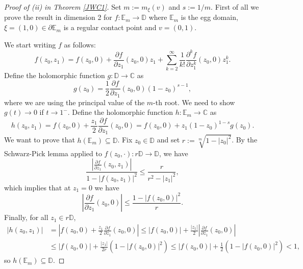 \documentclass[11pt, reqno]{amsart}
\numberwithin{equation}{section}
\theoremstyle{definition}
\newcommand{\C}{\mathbb{C}}
\newcommand{\D}{\mathbb{D}}
\begin{document}
{{{		
		
		\begin{proof}[Proof of (ii) in  Theorem \ref{JWC1}]  
			Set $m:=m_\xi(v)$ and $s:=1/m$. First of all we prove the result in dimension 2 for $f\colon \mathbb{E}_m\to\D$ where $\mathbb{E}_m$ is the egg domain, $\xi=(1,0)\in\partial\mathbb{E}_m$ is a regular contact point and $v=(0,1)$. 
			
			We start writing  $f$ as follows:
			$$f(z_0,z_1)=f(z_0,0)+\frac{\partial f}{\partial z_1}(z_0,0)z_1+\sum_{k=2}^{\infty}\frac{1}{k!}\frac{\partial^kf}{\partial z_1^k}(z_0,0)z_1^k.$$
			Define the holomorphic function $g\colon \D\to \C$  as
			$$g(z_0)=\frac{1}{2}\frac{\partial f}{\partial z_1}(z_0,0)(1-z_0)^{s-1},$$ where we are using  the principal value of the $m$-th root. 
			We need to show $g(t)\to0$ if $t\to1^-$.
			Define the holomorphic function $h\colon \mathbb{E}_m\to \C$  as $$h(z_0,z_1)=f(z_0,0)+\frac{z_1}{2}\frac{\partial f}{\partial z_1}(z_0,0)=f(z_0,0)+z_1(1-z_0)^{1-s}g(z_0).$$
			We want to prove that $h(\mathbb{E}_m)\subseteq\D$. Fix $z_0\in\D$ and set $r:=\sqrt[m]{1-|z_0|^2}$. By the Schwarz-Pick lemma applied to $f(z_0,\cdot)\colon r\D\to \D$, we have
			$$\frac{\left|\frac{\partial f}{\partial z_1}(z_0,z_1)\right|}{1-|f(z_0,z_1)|^2}\leq\frac{r}{r^2-|z_1|^2},$$
			which implies that at $z_1=0$ we have $$\left|\frac{\partial f}{\partial z_1}(z_0,0)\right|\leq\frac{1-|f(z_0,0)|^2}{r}.$$
			Finally, for all $z_1\in r\D$,
			\begin{align*}|h(z_0,z_1)|&=\left|f(z_0,0)+\frac{z_1}{2}\frac{\partial f}{\partial z_1}(z_0,0)\right|\leq |f(z_0,0)|+\frac{|z_1|}{2}\left|\frac{\partial f}{\partial z_1}(z_0,0)\right|\\&\leq |f(z_0,0)|+\frac{|z_1|}{2r}(1-|f(z_0,0)|^2)\leq |f(z_0,0)|+\frac{1}{2}(1-|f(z_0,0)|^2)<1,\end{align*}
			so $h(\mathbb{E}_m)\subseteq\D$.
			

\end{proof}}}}
\end{document}
